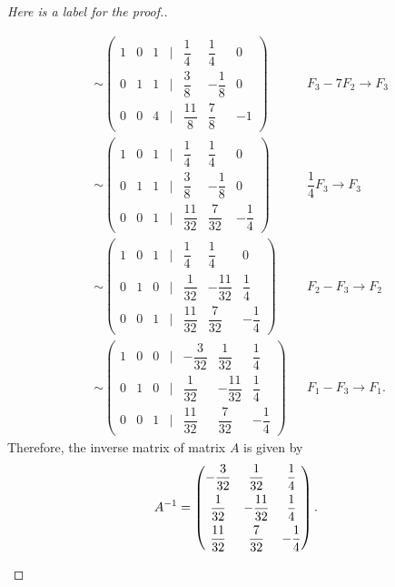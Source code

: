 \documentclass[11pt]{article}
\begin{document}
\begin{proof}[Here is a label for the proof.]
\begin{enumerate}[leftmargin=*,label=\textit{\alph*})]
\begin{align*}
            & \sim \begin{pmatrix}
            1 & 0 & 1 & | & \dfrac{1}{4} & \dfrac{1}{4} & 0\\[0.75em]
            0 & 1 & 1 & | & \dfrac{3}{8} & -\dfrac{1}{8} & 0\\[0.75em]
            0 & 0 & 4 & | & \dfrac{11}{8} & \dfrac{7}{8} & -1
        \end{pmatrix} && F_3 - 7 F_2 \rightarrow F_3 \\[0.75em]
            & \sim \begin{pmatrix}
            1 & 0 & 1 & | & \dfrac{1}{4} & \dfrac{1}{4} & 0\\[0.75em]
            0 & 1 & 1 & | & \dfrac{3}{8} & -\dfrac{1}{8} & 0\\[0.75em]
            0 & 0 & 1 & | & \dfrac{11}{32} & \dfrac{7}{32} & -\dfrac{1}{4}
        \end{pmatrix} && \dfrac{1}{4}F_3 \rightarrow F_3 \\[0.75em]
            & \sim \begin{pmatrix}
            1 & 0 & 1 & | & \dfrac{1}{4} & \dfrac{1}{4} & 0\\[0.75em]
            0 & 1 & 0 & | & \dfrac{1}{32} & -\dfrac{11}{32} & \dfrac{1}{4}\\[0.75em]
            0 & 0 & 1 & | & \dfrac{11}{32} & \dfrac{7}{32} & -\dfrac{1}{4}
        \end{pmatrix} && F_2-F_3 \rightarrow F_2 \\[0.75em]
            & \sim \begin{pmatrix}
            1 & 0 & 0 & | & -\dfrac{3}{32} & \dfrac{1}{32} & \dfrac{1}{4}\\[0.75em]
            0 & 1 & 0 & | & \dfrac{1}{32} & -\dfrac{11}{32} & \dfrac{1}{4}\\[0.75em]
            0 & 0 & 1 & | & \dfrac{11}{32} & \dfrac{7}{32} & -\dfrac{1}{4}
        \end{pmatrix} && F_1-F_3 \rightarrow F_1.
        \end{align*}
    Therefore, the inverse matrix of matrix $A$ is given by
    \[
        A^{-1} = \begin{pmatrix}
             -\dfrac{3}{32} & \dfrac{1}{32} & \dfrac{1}{4}\\[0.75em]
             \dfrac{1}{32} & -\dfrac{11}{32} & \dfrac{1}{4}\\[0.75em]
             \dfrac{11}{32} & \dfrac{7}{32} & -\dfrac{1}{4}
        \end{pmatrix}. \qedhere
    \]
\end{enumerate}
\end{proof}    
\end{document}
